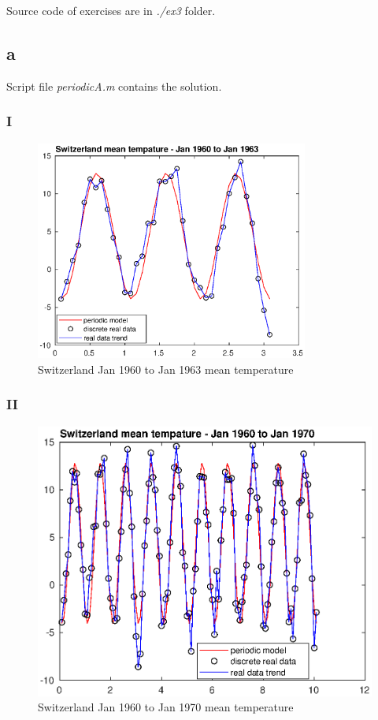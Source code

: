 \documentclass[unicode,11pt,a4paper,oneside,numbers=endperiod,openany]{scrartcl}
\begin{document}
Source code of exercises are in \textit{./ex3} folder.

\subsection*{a}

Script file \textit{periodicA.m} contains the solution.

\subsubsection*{I}

\begin{figure}[H]
    \centering
    \caption{Switzerland Jan 1960 to Jan 1963 mean temperature}
    \label{fig:ex3a-i}
    \includegraphics[width=0.8\textwidth]{ex3a-i.eps}
\end{figure}

\subsubsection*{II}

\begin{figure}[H]
    \centering
    \caption{Switzerland Jan 1960 to Jan 1970 mean temperature}
    \label{fig:ex3a-ii}
    \includegraphics[width=\textwidth]{ex3a-ii.eps}
\end{figure}
\end{document}
